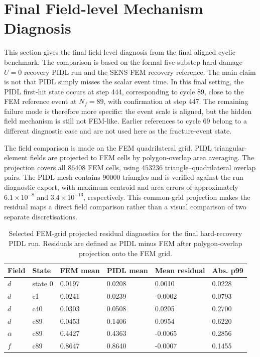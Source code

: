 \section{Final Field-level Mechanism Diagnosis}
\label{sec:c4_final_mechanism_diagnosis}

This section gives the 
final field-level diagnosis from the final aligned cyclic benchmark. The comparison is based on the formal five-substep hard-damage \(U=0\) recovery PIDL run and the SENS FEM recovery reference. The main claim is not that PIDL simply misses the scalar event time. In this final setting, the PIDL first-hit state occurs at step 444, corresponding to cycle 89, close to the FEM reference event at \(N_f=89\), with confirmation at step 447. The remaining failure mode is therefore more specific: the event scale is aligned, but the hidden field mechanism is still not FEM-like. Earlier references to cycle 69 belong to a different diagnostic case and are not used here as the fracture-event state.

The field comparison is made on the FEM quadrilateral grid. PIDL triangular-element fields are projected to FEM cells by polygon-overlap area averaging. The projection covers all \(86408\) FEM cells, using \(453236\) triangle--quadrilateral overlap pairs. The PIDL mesh contains \(90000\) triangles and is verified against the run diagnostic export, with maximum centroid and area errors of approximately \(6.1\times10^{-8}\) and \(3.4\times10^{-13}\), respectively. This common-grid projection makes the residual maps a direct field comparison rather than a visual comparison of two separate discretisations.

\begin{table}[!htbp]
\centering
\caption{Selected FEM-grid projected residual diagnostics for the final hard-recovery PIDL run. Residuals are defined as PIDL minus FEM after polygon-overlap projection onto the FEM grid.}
\label{tab:c4_projected_residual_diagnostics}
\begin{tabular}{p{} p{} p{} p{} p{} p{}}
\hline
\textbf{Field} & \textbf{State} & \textbf{FEM mean} & \textbf{PIDL mean} & \textbf{Mean residual} & \textbf{Abs. p99} \\
\hline
\(d\) & state 0 & 0.0197 & 0.0208 & 0.0010 & 0.0228 \\
\(d\) & c1 & 0.0241 & 0.0239 & -0.0002 & 0.0793 \\
\(d\) & c40 & 0.0303 & 0.0508 & 0.0205 & 0.2700 \\
\(d\) & c89 & 0.0453 & 0.1406 & 0.0954 & 0.6220 \\
\(\bar{\alpha}\) & c89 & 0.4427 & 0.4363 & -0.0065 & 0.2856 \\
\(f\) & c89 & 0.8647 & 0.8640 & -0.0007 & 0.1455 \\
\hline
\end{tabular}
\end{table}

